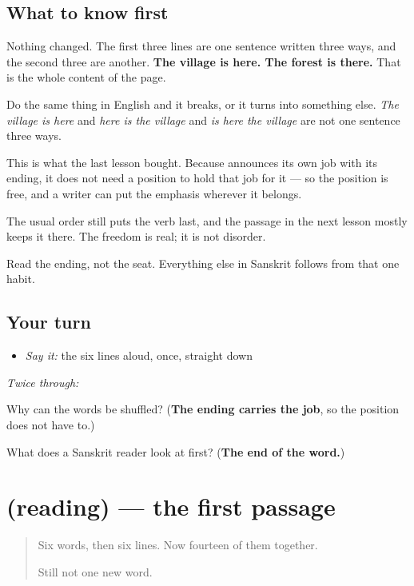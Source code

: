 \subsection*{What to know first}
Nothing changed. The first three lines are one sentence written three ways, and the second three are another. \textbf{The village is here. The forest is there.} That is the whole content of the page.

Do the same thing in English and it breaks, or it turns into something else. \emph{The village is here} and \emph{here is the village} and \emph{is here the village} are not one sentence three ways.

This is what the last lesson bought. Because \textbf{} announces its own job with its ending, it does not need a position to hold that job for it — so the position is free, and a writer can put the emphasis wherever it belongs.

The usual order still puts the verb last, and the passage in the next lesson mostly keeps it there. The freedom is real; it is not disorder.

Read the ending, not the seat. Everything else in Sanskrit follows from that one habit.

\subsection*{Your turn}
\begin{itemize}
\raggedright
  \item \emph{Say it:} the six lines aloud, once, straight down
\end{itemize}

\emph{Twice through:}

\begin{tcolorbox}[breakable,colback=teal!4,colframe=teal!35!black,title={Before you move on}]
Why can the words be shuffled? (\textbf{The ending carries the job}, so the position does not have to.)

What does a Sanskrit reader look at first? (\textbf{The end of the word.})
\end{tcolorbox}
\section[(reading)]{(reading) — the first passage}

\label{lesson:SA-C64-prathama-pathanam}



\begin{quote}
Six words, then six lines. Now fourteen of them together.

Still not one new word.
\end{quote}

